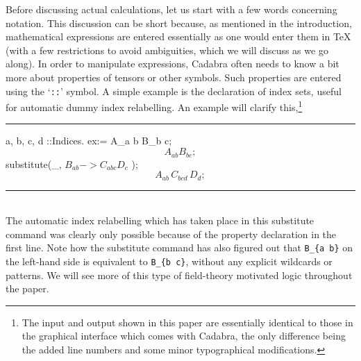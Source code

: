 \documentclass[11pt]{article}
\newcommand{\toprule}{\par\vspace{1ex}\noindent\hspace{25pt}\rule{435pt}{.1pt}}
\newcommand{\botrule}{\noindent\hspace{25pt}\rule{435pt}{.1pt}\\[2ex]}
\newenvironment{cdbin}{\fvset{firstnumber=1}\color[named]{Blue}\Verbatim}{\endVerbatim}
\newenvironment{cdbcont}{\fvset{firstnumber=last}\color[named]{Blue}\Verbatim}{\endVerbatim}
\newenvironment{cdbout}{\vspace{-1.4ex}\begin{equation}}{\end{equation}\vspace{-1.4ex}}
\newcommand{\Cdb}{{Cadabra}\xspace}
\begin{document}
Before discussing actual calculations, let us start with a few words
concerning notation. This discussion can be short because, as
mentioned in the introduction, mathematical expressions are entered
essentially as one would enter them in \TeX{} (with a few restrictions
to avoid ambiguities, which we will discuss as we go along). In order
to manipulate expressions, \Cdb often needs to know a bit more about
properties of tensors or other symbols. Such properties are entered
using the `\verb|::|' symbol. A simple example is the declaration of
index sets, useful for automatic dummy index relabelling. An example
will clarify this,\footnote{The input and output shown in this paper
are essentially identical to those in the graphical interface which
comes with \Cdb, the only difference being the added line numbers and
some minor typographical modifications.}  \toprule
\begin{cdbin}
{ a, b, c, d }::Indices.
ex:= A_{a b} B_{b c};
\end{cdbin}
\begin{cdbout}
A_{a b} B_{b c};
\end{cdbout}
\begin{cdbcont}
substitute(_, $B_{a b} ->  C_{a b c} D_{c}$ );
\end{cdbcont}
\begin{cdbout}
A_{a b} \, C_{b c d} \, D_{d};
\end{cdbout}
\botrule
The automatic index relabelling which has taken place in this
substitute command was clearly only possible because of the property
declaration in the first line. Note how the substitute command has
also figured out that \verb|B_{a b}| on the left-hand side is
equivalent to \verb|B_{b c}|, without any explicit wildcards or
patterns. We will see more of this type of field-theory motivated
logic throughout the paper.
\end{document}
